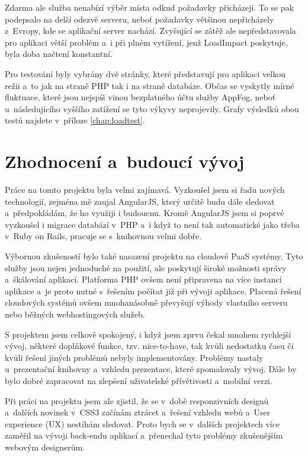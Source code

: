 \documentclass[11pt,twoside,a4paper]{book}
\newcommand*{\nomExpl}[2]{#2 (#1)\nomenclature{#1}{#2}} 	%
\begin{document}
Zdarma ale služba nenabízí výběr místa odkud požadavky přicházejí. To se pak podepsalo na delší odezvě serveru, neboť požadavky většinou nepřicházely z~Evropy, kde se aplikační server nachází. Zvyšující se zátěž ale nepředstavovala pro aplikaci větší problém a~i při plném vytížení, jenž LoadImpact poskytuje, byla doba načtení konstantní.

Pro testování byly vybrány dvě stránky, které představují pro aplikaci velkou režii a~to jak na straně PHP tak i na straně databáze. Občas se vyskytly mírné fluktuace, které jsou nejspíš vinou bezplatného účtu služby AppFog, neboť u~následujícího vyššího zatížení se tyto výkyvy neprojevily. Grafy výsledků obou testů najdete v~příloze \ref{chap:loadtest}.



\chapter{Zhodnocení a~budoucí vývoj}
Práce na tomto projektu byla velmi zajímavá. Vyzkoušel jsem si řadu nových technologií, zejména mě zaujal AngularJS, který určitě budu dále sledovat a~předpokládám, že ho využiji i budoucnu. Kromě AngularJS jsem si poprvé vyzkoušel i migrace databází v~PHP a~i když to není tak automatické jako třeba v~Ruby on Rails, pracuje se s~knihovnou velmi dobře.

Výbornou zkušeností bylo také nasazení projektu na cloudové PaaS systémy. Tyto služby jsou nejen jednoduché na použití, ale poskytují široké možnosti správy a~škálování aplikací. Platforma PHP ovšem není připravena na více instancí aplikace a~je proto nutné s~řešením počítat již při vývoji aplikace. Placená řešení cloudových systémů ovšem mnohanásobně převyšují výhody vlastního serveru nebo běžných webhostingových služeb.

S projektem jsem celkově spokojený, i když jsem zprvu čekal mnohem rychlejší vývoj, některé doplňkové funkce, tzv. nice-to-have, tak kvůli nedostatku času či kvůli řešení jiných problémů nebyly imple\-mentovány. Problémy nastaly u~prezentační knihovny a~vzhledu prezentace, které zpomalovaly vývoj. Dále by bylo dobré zapracovat na zlepšení uživatelské přívětivosti a~mobilní verzi.

Při práci na projektu jsem ale zjistil, že se v~době responzivních designů a~dalších novinek v~CSS3 začínám ztrácet a~řešení vzhledu webů a~\nomExpl{UX}{User experience} nestíhám sledovat. Proto bych se v~dalších projektech více zaměřil na vývoji back-endu aplikací a~přenechal tyto problémy zkušenějším webovým designerům.
\end{document}
